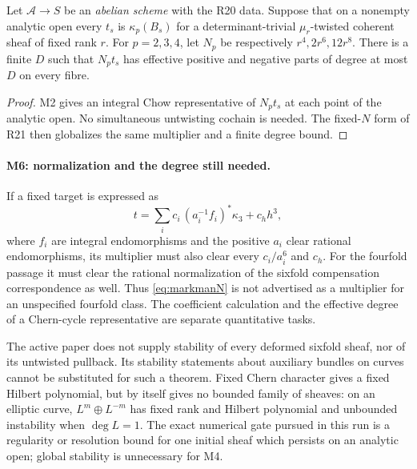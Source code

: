 \begin{proposition}\label{M4}
Let $\mathcal A\to S$ be an \emph{abelian scheme} with the R20 data. Suppose that on a nonempty analytic open every $t_s$ is $\kappa_p(B_s)$ for a determinant-trivial $\mu_r$-twisted coherent sheaf of fixed rank $r$. For $p=2,3,4$, let $N_p$ be respectively $r^4,2r^6,12r^8$. There is a finite $D$ such that $N_pt_s$ has effective positive and negative parts of degree at most $D$ on every fibre.
\end{proposition}
\begin{proof}
M2 gives an integral Chow representative of $N_pt_s$ at each point of the analytic open. No simultaneous untwisting cochain is needed. The fixed-$N$ form of R21 then globalizes the same multiplier and a finite degree bound.
\end{proof}

\paragraph{M6: normalization and the degree still needed.}
If a fixed target is expressed as
\[
 t=\sum_i c_i\,(a_i^{-1}f_i)^*\kappa_3+c_hh^3,
\]
where $f_i$ are integral endomorphisms and the positive $a_i$ clear rational endomorphisms, its multiplier must also clear every $c_i/a_i^6$ and $c_h$. For the fourfold passage it must clear the rational normalization of the sixfold compensation correspondence as well. Thus \eqref{eq:markmanN} is not advertised as a multiplier for an unspecified fourfold class. The coefficient calculation and the effective degree of a Chern-cycle representative are separate quantitative tasks.

The active paper does not supply stability of every deformed sixfold sheaf, nor of its untwisted pullback. Its stability statements about auxiliary bundles on curves cannot be substituted for such a theorem. Fixed Chern character gives a fixed Hilbert polynomial, but by itself gives no bounded family of sheaves: on an elliptic curve, $L^m\oplus L^{-m}$ has fixed rank and Hilbert polynomial and unbounded instability when $\deg L=1$. The exact numerical gate pursued in this run is a regularity or resolution bound for one initial sheaf which persists on an analytic open; global stability is unnecessary for M4.

